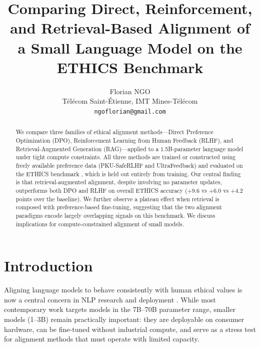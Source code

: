 %
%
%

\title{Comparing Direct, Reinforcement, and Retrieval-Based Alignment of a Small Language Model on the ETHICS Benchmark}

\author{Florian NGO \\
  Télécom Saint-Étienne, IMT Mines-Télécom \\
  \texttt{ngoflorian@gmail.com}}


\maketitle

\begin{abstract}
We compare three families of ethical alignment methods—Direct Preference Optimization (DPO), Reinforcement Learning from Human Feedback (RLHF), and Retrieval-Augmented Generation (RAG)—applied to a 1.5B-parameter language model under tight compute constraints. All three methods are trained or constructed using freely available preference data (PKU-SafeRLHF and UltraFeedback) and evaluated on the ETHICS benchmark \citep{hendrycks2021ethics}, which is held out entirely from training. Our central finding is that retrieval-augmented alignment, despite involving no parameter updates, outperforms both DPO and RLHF on overall ETHICS accuracy (+9.6 vs +6.0 vs +4.2 points over the baseline). We further observe a plateau effect when retrieval is composed with preference-based fine-tuning, suggesting that the two alignment paradigms encode largely overlapping signals on this benchmark. We discuss implications for compute-constrained alignment of small models.
\end{abstract}

\section{Introduction}

Aligning language models to behave consistently with human ethical values is now a central concern in NLP research and deployment \citep{ouyang2022instructgpt,bai2022constitutional}. While most contemporary work targets models in the 7B--70B parameter range, smaller models (1--3B) remain practically important: they are deployable on consumer hardware, can be fine-tuned without industrial compute, and serve as a stress test for alignment methods that must operate with limited capacity.

